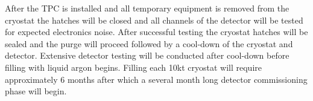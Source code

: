 After the TPC is installed and all temporary equipment is removed from the cryostat the hatches will be 
closed and all channels of the detector will be tested for expected electronics noise. After successful 
testing the cryostat hatches will be sealed and the purge will proceed followed by a cool-down of the 
cryostat and detector.  Extensive detector testing will be conducted after cool-down before filling with 
liquid argon begins. Filling each 10kt cryostat will require approximately 6 months after which a several 
month long detector commissioning phase will begin.

